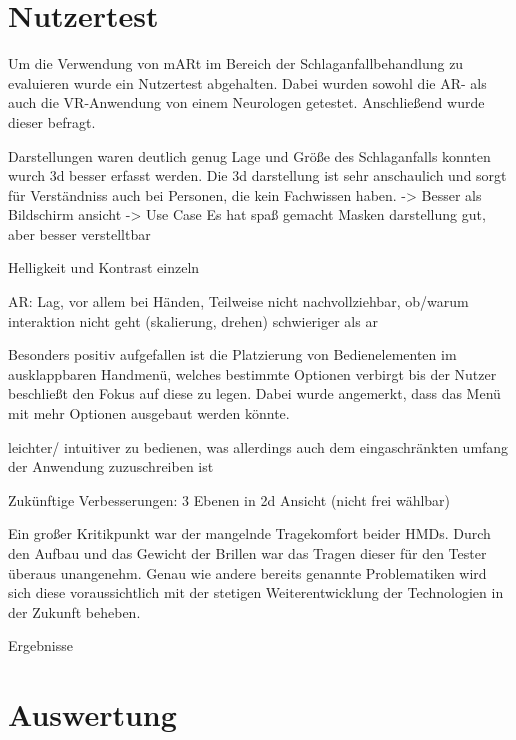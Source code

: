 \section{Nutzertest}

Um die Verwendung von mARt im Bereich der Schlaganfallbehandlung zu evaluieren wurde ein Nutzertest abgehalten. 
Dabei wurden sowohl die AR- als auch die VR-Anwendung von einem Neurologen getestet. Anschließend wurde dieser befragt.

Darstellungen waren deutlich genug
Lage und Größe des Schlaganfalls konnten wurch 3d besser erfasst werden. Die 3d darstellung ist sehr anschaulich und sorgt für Verständniss auch bei Personen, die kein Fachwissen haben. -> Besser als Bildschirm ansicht
-> Use Case 
Es hat spaß gemacht
Masken darstellung gut, aber besser verstelltbar

Helligkeit und Kontrast einzeln

AR: Lag, vor allem bei Händen, 
Teilweise nicht nachvollziehbar, ob/warum interaktion nicht geht (skalierung, drehen)
schwieriger als ar

Besonders positiv aufgefallen ist die Platzierung von Bedienelementen im ausklappbaren Handmenü, welches bestimmte Optionen verbirgt bis der Nutzer beschließt den Fokus auf diese zu legen. Dabei wurde angemerkt, dass das Menü mit mehr Optionen ausgebaut werden könnte. 

leichter/ intuitiver zu bedienen, was allerdings auch dem eingaschränkten umfang der Anwendung zuzuschreiben ist

Zukünftige Verbesserungen:
3 Ebenen in 2d Ansicht (nicht frei wählbar)

Ein großer Kritikpunkt war der mangelnde Tragekomfort beider HMDs. Durch den Aufbau und das Gewicht der Brillen war das Tragen dieser für den Tester überaus unangenehm. 
Genau wie andere bereits genannte Problematiken wird sich diese voraussichtlich mit der stetigen Weiterentwicklung der Technologien in der Zukunft beheben.

Ergebnisse

\section{Auswertung}

